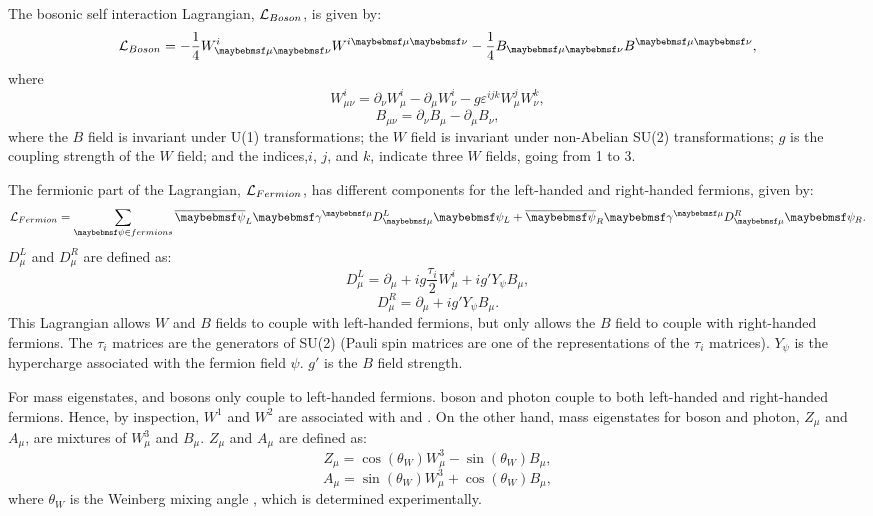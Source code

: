 The bosonic self interaction Lagrangian, $\operatorname{\mathcal{L}}_{Boson}$, is given by:
\begin{equation}
\Lagr_{Boson} = - \frac{1}{4} W^i_{\mu\nu} W^{i\mu\nu} - \frac{1}{4}B_{\mu\nu} B^{\mu\nu},
\end{equation}
where
\begin{equation}
W^i_{\mu\nu} = \partial_{\nu}W^i_{\mu} - \partial_{\mu}W^i_{\nu} - g\varepsilon^{ijk}W^j_{\mu}W^k_\nu ,
\end{equation}
\begin{equation}
B_{\mu\nu} = \partial_{\nu}B_{\mu} - \partial_{\mu}B_{\nu},
\end{equation}
where the $B$ field  is invariant under U(1) transformations; the $W$ field is invariant under non-Abelian SU(2) transformations; $g$ is the coupling strength of the $W$ field; and the indices,$i$, $j$, and $k$, indicate three $W$ fields, going from 1 to 3.

The fermionic part of the Lagrangian,   $\operatorname{\mathcal{L}}_{Fermion}$, has different components for the left-handed and right-handed fermions, given by:
\begin{equation}
\Lagr_{Fermion} = \sum_{\psi\in{fermions}} {\overline{\psi}}_L \gamma^{\mu}D^L_{\mu} \psi_L +  \overline{\psi}_R \gamma^{\mu}D^R_{\mu} \psi_R .
\end{equation}
$D^L_{\mu}$ and $D^R_{\mu}$ are defined as:
\begin{equation}
D^L_{\mu} = \partial_{\mu} + ig\frac{\tau_i}{2}W^i_{\mu} + ig'Y_{\psi}B_{\mu} ,
\end{equation}
\begin{equation}
D^R_{\mu} = \partial_{\mu}  + ig'Y_{\psi}B_{\mu} .
\end{equation}
This Lagrangian allows $W$ and $B$ fields to couple with left-handed fermions, but only allows the $B$ field to couple with right-handed fermions. The $\tau_i$ matrices are the generators of SU(2) (Pauli spin matrices are one of the representations of the $\tau_i$ matrices). $Y_{\psi}$ is the hypercharge associated with the fermion field $\psi$. $g'$ is the $B$ field strength.

For mass eigenstates, \PWp and \PWm bosons only couple to left-handed fermions. \PZ boson and photon couple to both left-handed and right-handed fermions. Hence, by inspection, $W^1$ and $W^2$ are associated with \PWp and \PWm. On the other hand, mass eigenstates for \PZ boson and photon, $Z_{\mu}$ and $A_{\mu}$, are mixtures of $W^3_{\mu}$ and $B_{\mu}$. $Z_{\mu}$ and $A_{\mu}$ are defined as:
\begin{equation}
Z_{\mu} = \cos\left(\theta_W\right)W^3_{\mu} - \sin\left(\theta_W\right)B_{\mu},
\end{equation}
\begin{equation}
A_{\mu} = \sin\left(\theta_W\right)W^3_{\mu} + \cos\left(\theta_W\right)B_{\mu},
\end{equation}
where $\theta_W$ is the Weinberg mixing angle \cite{Weinberg:1967tq}, which is determined experimentally.

